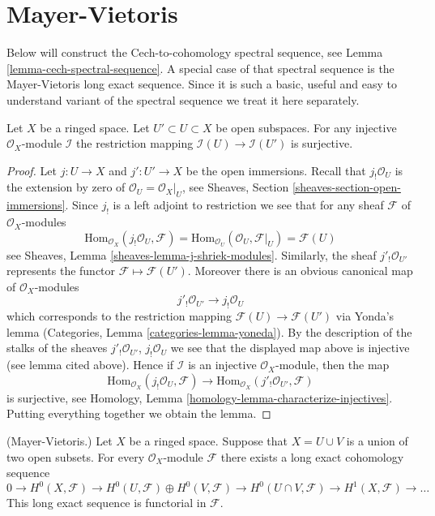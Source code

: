 \section{Mayer-Vietoris}
\label{section-mayer-vietoris}

\noindent
Below will construct the Cech-to-cohomology spectral sequence, see
Lemma \ref{lemma-cech-spectral-sequence}.
A special case of that spectral sequence is the Mayer-Vietoris
long exact sequence. Since it is such a basic, useful and easy to understand
variant of the spectral sequence we treat it here separately.

\begin{lemma}
\label{lemma-injective-restriction-surjective}
Let $X$ be a ringed space.
Let $U' \subset U \subset X$ be open subspaces.
For any injective $\mathcal{O}_X$-module $\mathcal{I}$ the
restriction mapping
$\mathcal{I}(U) \to \mathcal{I}(U')$ is surjective.
\end{lemma}

\begin{proof}
Let $j : U \to X$ and $j' : U' \to X$ be the open immersions.
Recall that $j_!\mathcal{O}_U$ is the extension by zero of
$\mathcal{O}_U = \mathcal{O}_X|_U$, see
Sheaves, Section \ref{sheaves-section-open-immersions}.
Since $j_!$ is a left adjoint to restriction we see that
for any sheaf $\mathcal{F}$ of $\mathcal{O}_X$-modules
$$
\text{Hom}_{\mathcal{O}_X}(j_!\mathcal{O}_U, \mathcal{F})
=
\text{Hom}_{\mathcal{O}_U}(\mathcal{O}_U, \mathcal{F}|_U)
=
\mathcal{F}(U)
$$
see Sheaves, Lemma \ref{sheaves-lemma-j-shriek-modules}.
Similarly, the sheaf $j'_!\mathcal{O}_{U'}$ represents the
functor $\mathcal{F} \mapsto \mathcal{F}(U')$.
Moreover there
is an obvious canonical map of $\mathcal{O}_X$-modules
$$
j'_!\mathcal{O}_{U'} \longrightarrow j_!\mathcal{O}_U
$$
which corresponds to the restriction mapping
$\mathcal{F}(U) \to \mathcal{F}(U')$ via Yonda's lemma
(Categories, Lemma \ref{categories-lemma-yoneda}). By the description
of the stalks of the sheaves
$j'_!\mathcal{O}_{U'}$, $j_!\mathcal{O}_U$
we see that the displayed map above is injective (see lemma cited above).
Hence if $\mathcal{I}$ is an injective $\mathcal{O}_X$-module,
then the map
$$
\text{Hom}_{\mathcal{O}_X}(j_!\mathcal{O}_U, \mathcal{F})
\longrightarrow
\text{Hom}_{\mathcal{O}_X}(j'_!\mathcal{O}_{U'}, \mathcal{F})
$$
is surjective, see
Homology, Lemma \ref{homology-lemma-characterize-injectives}.
Putting everything together we obtain the lemma.
\end{proof}

\begin{lemma}
\label{lemma-mayer-vietoris}
(Mayer-Vietoris.)
Let $X$ be a ringed space. Suppose that $X = U \cup V$ is a
union of two open subsets. For every $\mathcal{O}_X$-module $\mathcal{F}$
there exists a long exact cohomology sequence
$$
0 \to
H^0(X, \mathcal{F}) \to
H^0(U, \mathcal{F}) \oplus H^0(V, \mathcal{F}) \to
H^0(U \cap V, \mathcal{F}) \to
H^1(X, \mathcal{F}) \to \ldots
$$
This long exact sequence is functorial in $\mathcal{F}$.
\end{lemma}

